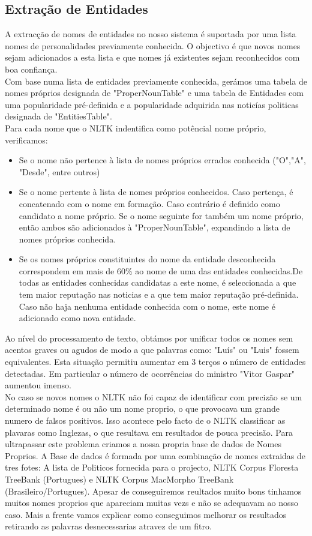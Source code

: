 \subsection{Extração de Entidades}
\label{sec:entity_extraction}
\hspace{15pt}A extracção de nomes de entidades no nosso sistema é suportada por uma lista nomes de personalidades previamente conhecida. O objectivo é que novos nomes sejam adicionados a esta lista e que nomes já existentes sejam reconhecidos com boa confiança.\\
Com base numa lista de entidades previamente conhecida, gerámos uma tabela de nomes próprios designada de "ProperNounTable" e uma tabela de Entidades com uma popularidade pré-definida e a popularidade adquirida nas noticías politicas designada de "EntitiesTable".\\
Para cada nome que o NLTK indentifica como potêncial nome próprio, verificamos:
\begin{itemize}
\item Se o nome não pertence à lista de nomes próprios errados conhecida ("O","A", "Desde", entre outros)
\item Se o nome pertente à lista de nomes próprios conhecidos. Caso pertença, é concatenado com o nome em formação. Caso contrário é definido como candidato a nome próprio. Se o nome seguinte for também um nome próprio, então ambos são adicionados à "ProperNounTable", expandindo a lista de nomes próprios conhecida. 
\item Se os nomes próprios constituintes do nome da entidade desconhecida correspondem em mais de 60\% ao nome de uma das entidades conhecidas.De todas as entidades conhecidas candidatas a este nome, é seleccionada a que tem maior reputação nas noticias e a que tem maior reputação pré-definida. Caso não haja nenhuma entidade conhecida com o nome, este nome é adicionado como nova entidade.
\end{itemize}

Ao nível do processamento de texto, obtámos por unificar todos os nomes sem acentos graves ou agudos de modo a que palavras como: "Luís" ou "Luis" fossem equivalentes. Esta situação permitiu aumentar em 3 terços o número de entidades detectadas. Em particular o número de ocorrências do ministro "Vitor Gaspar" aumentou imenso.\\
No caso se novos nomes o NLTK não foi capaz de identificar com precizão se um determinado nome é ou não um nome proprio, o que provocava um grande numero de falsos positivos. Isso acontece pelo facto de o NLTK classificar as plavaras como Inglezas, o que resultava em resultados de pouca precisão. Para ultrapassar este problema criamos a nossa propria base de dados de Nomes Proprios. A Base de dados é formada por uma combinação de nomes extraidas de tres fotes: A lista de Politicos fornecida para o projecto, NLTK Corpus Floresta TreeBank (Portugues) e NLTK Corpus MacMorpho TreeBank (Brasileiro/Portugues). Apesar de conseguiremos reultados muito bons tinhamos muitos nomes proprios que apareciam muitas vezs e não se adequavam ao nosso caso. Mais a frente vamos explicar como conseguimos melhorar os resultados retirando as palavras desnecessarias atravez de um fitro. 